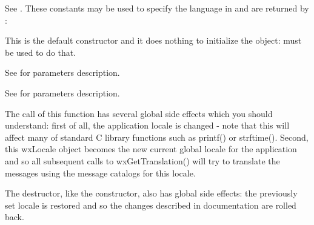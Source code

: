 


\label{wxlanguage}

See .
These constants may be used to specify the language
in  and are returned by 
:


\label{wxlocaledefctor}


This is the default constructor and it does nothing to initialize the object: 
 must be used to do that.


See  for parameters description.


See  for parameters description.

The call of this function has several global side effects which you should
understand: first of all, the application locale is changed - note that this
will affect many of standard C library functions such as printf() or strftime().
Second, this wxLocale object becomes the new current global locale for the
application and so all subsequent calls to wxGetTranslation() will try to
translate the messages using the message catalogs for this locale.



\label{wxlocaledtor}


The destructor, like the constructor, also has global side effects: the previously
set locale is restored and so the changes described in 
 documentation are rolled back.


\label{wxlocaleaddcatalog}


